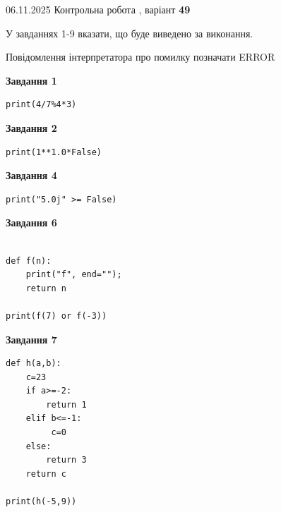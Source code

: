 \documentclass[12pt, ukrainian]{article}
\begin{document}
{\Large{06.11.2025 Контрольна робота , варіант  \No \textbf { 49 }\par}}
{
\begin {large}
У завданнях 1-9 вказати, що буде виведено за виконання.

Повідомлення інтерпретатора про помилку позначати ERROR

\begin{minipage}[t]{7.5cm}

\begin{center}
\textbf{Завдання 1}
\end{center}

\begin{verbatim}
print(4/7%4*3)
\end{verbatim}



\begin{center}
\textbf{Завдання 2}
\end{center}

\begin{verbatim}
print(1**1.0*False)
\end{verbatim}



\begin{center}
\textbf{Завдання 4}
\end{center}

\begin{verbatim}
print("5.0j" >= False)
\end{verbatim}



\begin{center}
\textbf{Завдання 6}
\end{center}

\begin{verbatim}

def f(n):
    print("f", end="");
    return n

print(f(7) or f(-3))
\end{verbatim}



\begin{center}
\textbf{Завдання 7}
\end{center}

\begin{verbatim}
def h(a,b):
    c=23
    if a>=-2:
        return 1
    elif b<=-1:
         c=0
    else: 
        return 3
    return c

print(h(-5,9))
\end{verbatim}


\end{minipage}
\end{large}}
\end{document}
